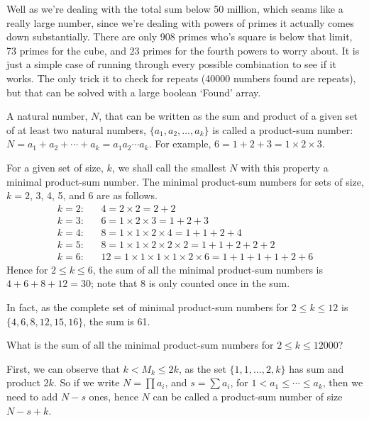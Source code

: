 Well as we're dealing with the total sum below 50 million, which seams like a really large number, since we're dealing with powers of primes it actually comes down substantially.  There are only 908 primes who's square is below that limit,
73 primes for the cube, and 23 primes for the fourth powers to worry about.  It is just a simple case of running through every possible combination to see if it works.  The only trick it to check for repeats (40000 numbers found are repeats), but that can be solved with a large boolean `Found' array.




A natural number, $N$, that can be written as the sum and product of a given set of at least two natural numbers, $\{a_1, a_2, \dots, a_k\}$ is called a product-sum number: $N = a_1+a_2+\cdots+a_k = a_1a_2\cdots a_k$.
For example, $6 = 1 + 2 + 3 = 1 \times 2 \times 3$.

For a given set of size, $k$, we shall call the smallest $N$ with this property a minimal product-sum number. The minimal product-sum numbers for sets of size, $k = 2$, 3, 4, 5, and 6 are as follows.
\begin{eqnarray*}
k=2: && 4 = 2 \times 2 = 2 + 2                                                  \\
k=3: && 6 = 1 \times 2 \times 3 = 1 + 2 + 3                                     \\
k=4: && 8 = 1 \times 1 \times 2 \times 4 = 1 + 1 + 2 + 4                        \\
k=5: && 8 = 1 \times 1 \times 2 \times 2 \times 2 = 1 + 1 + 2 + 2 + 2           \\
k=6: && 12 = 1 \times 1 \times 1 \times 1 \times 2 \times 6 = 1 + 1 + 1 + 1 + 2 + 6
\end{eqnarray*}
Hence for $2\leq k\leq6$, the sum of all the minimal product-sum numbers is $4+6+8+12 = 30$; note that 8 is only counted once in the sum.

In fact, as the complete set of minimal product-sum numbers for $2\leq k\leq 12$ is $\{4, 6, 8, 12, 15, 16\}$, the sum is 61.

What is the sum of all the minimal product-sum numbers for $2\leq k\leq 12000$?

First, we can observe that $k < M_k \leq 2k$, as the set $\{1,1,\dots, 2, k\}$ has sum and product $2k$.  So if we write $N = \prod a_i$, and $s = \sum a_i$, for $1 < a_1 \leq \cdots \leq a_k$, then we need to add $N-s$ ones, hence $N$ can be called a product-sum number of size $N-s+k$.


